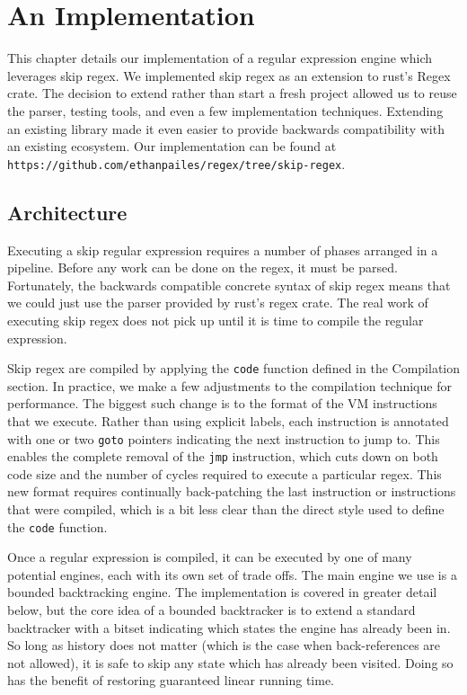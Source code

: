 \chapter{An Implementation}
\label{chapter:implementation}

This chapter details our implementation of a regular expression
engine which leverages skip regex. We implemented skip regex as
an extension to rust's Regex crate. The decision to extend rather
than start a fresh project allowed us to reuse the parser,
testing tools, and even a few implementation techniques. Extending
an existing library made it even easier to provide backwards
compatibility with an existing ecosystem. Our implementation
can be found at \verb'https://github.com/ethanpailes/regex/tree/skip-regex'.


\section{Architecture}

Executing a skip regular expression requires a number of phases
arranged in a pipeline. Before any work can be done on the regex,
it must be parsed. Fortunately, the backwards compatible concrete
syntax of skip regex means that we could just use the parser provided
by rust's regex crate. The real work of executing skip regex does not
pick up until it is time to compile the regular expression.

Skip regex are compiled by applying the \verb'code' function defined
in the Compilation section. In practice, we make a few adjustments to
the compilation technique for performance. The biggest such change
is to the format of the VM instructions that we execute. Rather than
using explicit labels, each instruction is annotated with one or
two \verb'goto' pointers indicating the next instruction to jump to.
This enables the complete removal of the \verb'jmp' instruction, which
cuts down on both code size and the number of cycles required to execute
a particular regex. This new format requires continually back-patching
the last instruction or instructions that were compiled, which is a bit
less clear than the direct style used to define the \verb'code' function.

Once a regular expression is compiled, it can be executed by one
of many potential engines, each with its own set of trade offs.
The main engine we use is a bounded backtracking engine. The
implementation is covered in greater detail below, but the core
idea of a bounded backtracker is to extend a standard backtracker
with a bitset indicating which states the engine has already
been in. So long as history does not matter (which is the case
when back-references are not allowed), it is safe to skip any
state which has already been visited. Doing so has the benefit
of restoring guaranteed linear running time.

